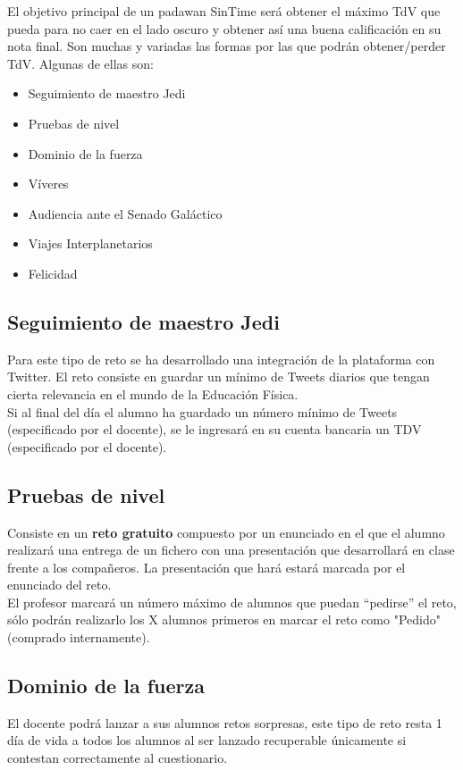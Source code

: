 El objetivo principal de un padawan SinTime será obtener el máximo TdV que pueda para no caer en el lado oscuro y obtener así una buena calificación en su nota final. Son muchas y variadas las formas por las que podrán obtener/perder TdV. Algunas de ellas son:

\begin{itemize}
	\item Seguimiento de maestro Jedi
	\item Pruebas de nivel
	\item Dominio de la fuerza
	\item Víveres
	\item Audiencia ante el Senado Galáctico
	\item Viajes Interplanetarios
	\item Felicidad
\end{itemize}

\subsection{Seguimiento de maestro Jedi}
Para este tipo de reto se ha desarrollado una integración de la plataforma con Twitter. El reto consiste en guardar un mínimo de Tweets diarios que tengan cierta relevancia en el mundo de la Educación Física.\\

Si al final del día el alumno ha guardado un número mínimo de Tweets (especificado por el docente), se le ingresará en su cuenta bancaria un TDV (especificado por el docente).

\subsection{Pruebas de nivel}
Consiste en un \textbf{reto gratuito} compuesto por un enunciado en el que el alumno realizará una entrega de un fichero con una presentación que desarrollará en clase frente a los compañeros. La presentación que hará estará marcada por el enunciado del reto.\\

El profesor marcará un número máximo de alumnos que puedan ``pedirse'' el reto, sólo podrán realizarlo los X alumnos primeros en marcar el reto como "Pedido" (comprado internamente).

\subsection{Dominio de la fuerza}
El docente podrá lanzar a sus alumnos retos sorpresas, este tipo de reto resta 1 día de vida a todos los alumnos al ser lanzado recuperable únicamente si contestan correctamente al cuestionario.

